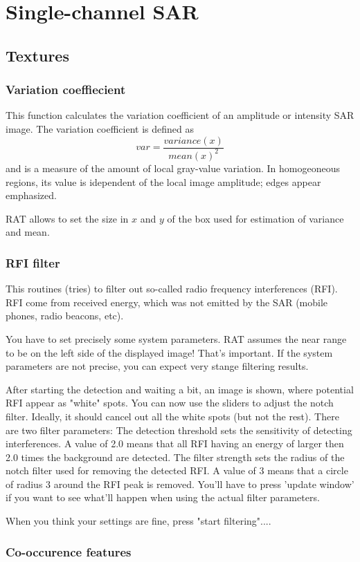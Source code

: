 \chapter{Single-channel SAR}


\section{Textures}

\subsection{Variation coeffiecient}

This function calculates the variation coefficient of an
amplitude or intensity SAR image. The variation coefficient
is defined as
\begin{equation}
  var = \frac{variance(x)}{mean(x)^2}
\end{equation}
and is a measure of the amount of local gray-value variation.
In homogeoneous regions, its value is idependent of the 
local image amplitude; edges appear emphasized.

RAT allows to set the size in $x$ and $y$ of the box used
for estimation of variance and mean.

\subsection{RFI filter}\label{sec:sarrfi}

This routines (tries) to filter out so-called radio frequency interferences (RFI).
RFI come from received energy, which was not emitted by the SAR (mobile phones,
radio beacons, etc).

You have to set precisely some system parameters. RAT assumes the near range
to be on the left side of the displayed image! That's important. If the system
parameters are not precise, you can expect very stange filtering results. 

After starting the detection and waiting a bit, an image is shown, where potential RFI appear as
"white" spots. You can now use the sliders to adjust the notch filter. Ideally,
it should cancel out all the white spots (but not the rest). There are two filter parameters: The detection threshold sets the sensitivity
of detecting interferences. A value of 2.0 means that all RFI having an energy
of larger then 2.0 times the background are detected. The filter strength sets
the radius of the notch filter used for removing the detected RFI. A value of
3 means that a circle of radius 3 around the RFI peak is removed. You'll have to
press 'update window' if you want to see what'll happen when using the actual
filter parameters.

When you think your settings are fine, press "start filtering"....

\subsection{Co-occurence features}
